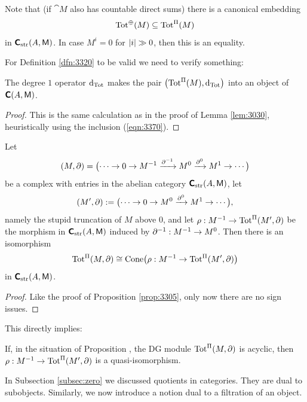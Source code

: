 Note that (if $\cat{M}$ also has countable direct sums) there is a canonical 
embedding 
\begin{equation} \label{eqn:3370}
\operatorname{Tot}^{\oplus}(M) \subseteq \operatorname{Tot}^{\Pi}(M) 
\end{equation}
in $\boldsymbol{\mathsf{C}}_{\mathrm{str}}(A, \operatorname{\mathsf{M}})$. 
In case $M^i = 0$ for $\lvert i \rvert \gg 0$, then this is an equality.

For Definition \ref{dfn:3320} to be valid we need to verify something: 

\begin{lem} \label{lem:3031}
The degree $1$ operator $\mathrm{d}_{\mathrm{Tot}}$ makes the pair 
$\bigl( \operatorname{Tot}^{\Pi}(M), \mathrm{d}_{\mathrm{Tot}} \bigr)$
into an object of $\boldsymbol{\mathsf{C}}(A, \operatorname{\mathsf{M}})$. 
\end{lem}

\begin{proof}
This is the same calculation as in the proof of Lemma \ref{lem:3030},
heuristically using the inclusion (\ref{eqn:3370}).
\end{proof}

\begin{prop} \label{prop:3320}
Let 
\[ (M, \partial) =  \bigl( \cdots \to 0 \to M^{-1} \xrightarrow{\partial^{-1}}
M^{0} \xrightarrow{\partial^{0}} M^{1} \to \cdots \bigr) \]
be a complex with entries in the abelian category 
$\boldsymbol{\mathsf{C}}_{\mathrm{str}}(A, \operatorname{\mathsf{M}})$, let 
\[ (M', \partial) :=  \bigl( \cdots \to 0 \to M^{0} \xrightarrow{\partial^{0}} M^{1} \to \cdots 
\bigr) , \]
namely the stupid truncation of $M$ above $0$, and let 
$\rho : M^{-1} \to \operatorname{Tot}^{\Pi}(M', \partial)$
be the morphism in $\boldsymbol{\mathsf{C}}_{\mathrm{str}}(A, \operatorname{\mathsf{M}})$ induced by
$\partial^{-1} : M^{-1} \to M^0$. Then there is an isomorphism 
\[ \operatorname{Tot}^{\Pi}(M, \partial) \cong 
\operatorname{Cone} \bigl( \rho : M^{-1} \to \operatorname{Tot}^{\Pi}(M', \partial) \bigr) \]
in $\boldsymbol{\mathsf{C}}_{\mathrm{str}}(A, \operatorname{\mathsf{M}})$. 
\end{prop}

\begin{proof}
Like the proof of Proposition \ref{prop:3305}, only now there are no sign 
issues. 
\end{proof}

This directly implies:

\begin{cor} \label{cor:3320}
If, in the situation of Proposition \tup{\ref{prop:3320}}, the DG module \lb 
$\operatorname{Tot}^{\Pi}(M, \partial)$ is acyclic, then 
$\rho : M^{-1} \to \operatorname{Tot}^{\Pi}(M', \partial)$
is a quasi-isomorphism. 
\end{cor}

In Subsection \ref{subsec:zero} 
we discussed quotients in categories. They are dual to subobjects. Similarly, 
we now introduce a notion dual to a filtration of an object. 

